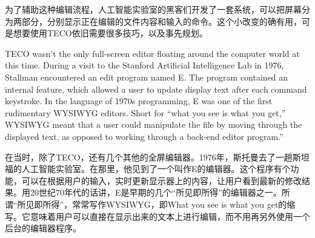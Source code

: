 \ifdefined\chs
为了辅助这种编辑流程，人工智能实验室的黑客们开发了一套系统，可以把屏幕分为两部分，分别显示正在编辑的文件内容和输入的命令。这个小改变的确有用，可是想要使用TECO依旧需要很多技巧，以及事先规划。
\fi

\ifdefined\eng
TECO wasn't the only full-screen editor floating around the computer world at this time. During a visit to the Stanford Artificial Intelligence Lab in 1976, Stallman encountered an edit program named E. The program contained an internal feature, which allowed a user to update display text after each command keystroke. In the language of 1970s programming, E was one of the first rudimentary WYSIWYG editors. Short for ``what you see is what you get,'' WYSIWYG meant that a user could manipulate the file by moving through the displayed text, as opposed to working through a back-end editor program.''
\fi

\ifdefined\chs
在当时，除了TECO，还有几个其他的全屏编辑器。1976年，斯托曼去了一趟斯坦福的人工智能实验室。在那里，他见到了一个叫作E的编辑器。这个程序有个功能，可以在根据用户的输入，实时更新显示器上的内容，让用户看到最新的修改结果。用20世纪70年代的话讲，E是早期的几个``所见即所得''的编辑器之一。所谓``所见即所得''，常常写作WYSIWYG，即What you see is what you get的缩写。它意味着用户可以直接在显示出来的文本上进行编辑，而不用再另外使用一个后台的编辑器程序。
\fi

